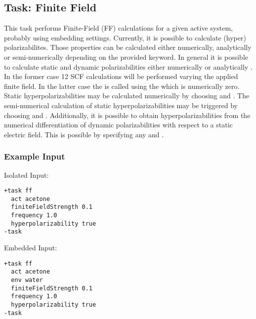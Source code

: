 \subsection{Task: Finite Field}\label{task: ff}
\label{sec:ff}
This task performs Finite-Field (FF) calculations for a given active system, probably using embedding settings. 
Currently, it is possible to calculate (hyper) polarizabilites. Those properties can be calculated
either numerically, analytically or semi-numerically depending on the provided  keyword.
In general it is possible to calculate static and dynamic polarizabilities either numerically  or analytically . In the former case 12 SCF calculations will be performed varying the applied finite field.
In the latter case the  is called using the  which is numerically zero.
Static hyperpolarizabilities may be calculated numerically by choosing  and .
The semi-numerical calculation of static hyperpolarizabilities may be triggered by choosing  and . Additionally, it is possible to obtain hyperpolarizabilities from the numerical differentiation
of dynamic polarizabilities with respect to a static electric field. This is possible by specifying any  and .
\subsubsection{Example Input}
Isolated Input:
\begin{lstlisting}
+task ff
  act acetone
  finiteFieldStrength 0.1
  frequency 1.0
  hyperpolarizability true
-task
\end{lstlisting}
Embedded Input:
\begin{lstlisting}
+task ff
  act acetone
  env water
  finiteFieldStrength 0.1
  frequency 1.0
  hyperpolarizability true
-task
\end{lstlisting}
